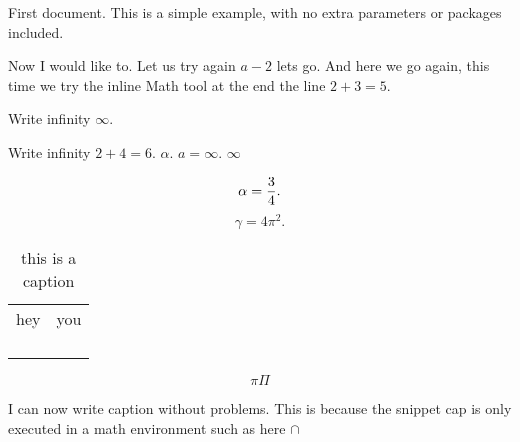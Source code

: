 \documentclass{article}
\begin{document}
First document. This is a simple example, with no 
extra parameters or packages included.

Now I would like to.
Let us try again $a-2$ lets go. And here we go again, this time we try the inline Math tool at the end
the line $2+3=5$.

Write infinity $\infty$.

Write infinity $2+4=6$.
$\alpha$. $a = \infty$. $ \infty $ 

\[
\alpha = \frac{3}{4}\\
.\] 
\[
\gamma = 4\pi ^{2} 
.\] 

\begin{table}[h]
    \centering
    \begin{tabular}{c|c}
            hey &  you \\
             &   \\
             &   \\
             &   \\
             &   \\
    \end{tabular}
    \caption{this is a caption}
    \label{tab:first}
\end{table}

\[
    \pi \Pi 
\]

I can now write caption without problems. This is because the snippet cap is only executed in
a math environment such as here \(\cap \) 
\end{document}
